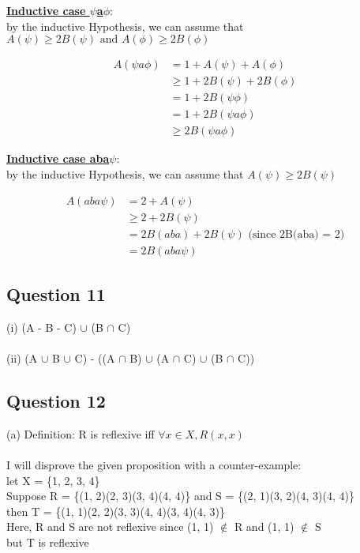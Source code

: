 \documentclass[11pt]{article}
\begin{document}
{{{\noindent
\underline{\textbf{Inductive case $\psi$a$\phi$}}: \\
by the inductive Hypothesis, we can assume that
$A(\psi) \geq 2B(\psi) \text{ and } A(\phi) \geq 2B(\phi)$

\begin{align*}
    A(\psi a \phi) &= 1 + A(\psi) + A(\phi) \\
    &\geq 1 + 2B(\psi) + 2B(\phi) \\
    &= 1 + 2B(\psi \phi) \\
    &= 1 + 2B(\psi a \phi) \\
    &\geq 2B(\psi a \phi)
\end{align*}

\noindent
\underline{\textbf{Inductive case aba$\psi$}}: \\
by the inductive Hypothesis, we can assume that
$A(\psi) \geq 2B(\psi)$

\begin{align*}
    A(aba \psi) &= 2 + A(\psi) \\
    &\geq 2 + 2B(\psi) \\
    &= 2B(aba) + 2B(\psi) \text{ (since 2B(aba) = 2)} \\
    &= 2B(aba\psi)
\end{align*}

\subsection*{Question 11}
(i) (A - B - C) $\cup$ (B $\cap$ C) \\ \\
(ii) (A $\cup$ B $\cup$ C) - ((A $\cap$ B) $\cup$ (A $\cap$ C) $\cup$ (B $\cap$ C))

\subsection*{Question 12}
(a) Definition: R is reflexive iff $\forall x \in X, R(x, x)$ \\ \\
%
I will disprove the given proposition with a counter-example: \\
let X = \{1, 2, 3, 4\} \\
Suppose R = \{(1, 2)(2, 3)(3, 4)(4, 4)\} and S = \{(2, 1)(3, 2)(4, 3)(4, 4)\} \\
then T = \{(1, 1)(2, 2)(3, 3)(4, 4)(3, 4)(4, 3)\} \\
Here, R and S are not reflexive since (1, 1) $\notin$ R and (1, 1) $\notin$ S \\
but T is reflexive

}}}
\end{document}
